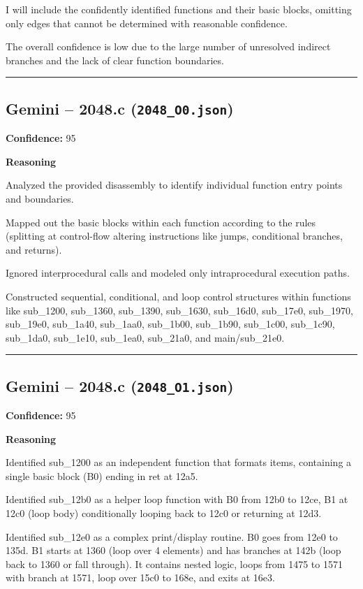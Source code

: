 I will include the confidently identified functions and their basic blocks, omitting only edges that cannot be determined with reasonable confidence.

The overall confidence is low due to the large number of unresolved indirect branches and the lack of clear function boundaries.

\bigskip
\hrule
\bigskip

\subsection{Gemini -- 2048.c (\texttt{2048\_O0.json})}

\textbf{Confidence:} 95

\textbf{Reasoning}

Analyzed the provided disassembly to identify individual function entry points and boundaries.

Mapped out the basic blocks within each function according to the rules (splitting at control-flow altering instructions like jumps, conditional branches, and returns).

Ignored interprocedural calls and modeled only intraprocedural execution paths.

Constructed sequential, conditional, and loop control structures within functions like sub\_1200, sub\_1360, sub\_1390, sub\_1630, sub\_16d0, sub\_17e0, sub\_1970, sub\_19e0, sub\_1a40, sub\_1aa0, sub\_1b00, sub\_1b90, sub\_1c00, sub\_1c90, sub\_1da0, sub\_1e10, sub\_1ea0, sub\_21a0, and main/sub\_21e0.

\bigskip
\hrule
\bigskip

\subsection{Gemini -- 2048.c (\texttt{2048\_O1.json})}

\textbf{Confidence:} 95

\textbf{Reasoning}

Identified sub\_1200 as an independent function that formats items, containing a single basic block (B0) ending in ret at 12a5.

Identified sub\_12b0 as a helper loop function with B0 from 12b0 to 12ce, B1 at 12c0 (loop body) conditionally looping back to 12c0 or returning at 12d3.

Identified sub\_12e0 as a complex print/display routine. B0 goes from 12e0 to 135d. B1 starts at 1360 (loop over 4 elements) and has branches at 142b (loop back to 1360 or fall through). It contains nested logic, loops from 1475 to 1571 with branch at 1571, loop over 15c0 to 168e, and exits at 16e3.

